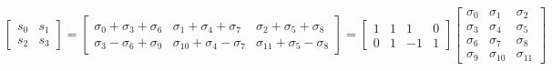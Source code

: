 \documentclass{article}%
\begin{document}
\[%
\left[\begin{matrix}s_{0} & s_{1}\\s_{2} & s_{3}\end{matrix}\right] = \left[\begin{matrix}\sigma_{0} + \sigma_{3} + \sigma_{6} & \sigma_{1} + \sigma_{4} + \sigma_{7} & \sigma_{2} + \sigma_{5} + \sigma_{8}\\\sigma_{3} - \sigma_{6} + \sigma_{9} & \sigma_{10} + \sigma_{4} - \sigma_{7} & \sigma_{11} + \sigma_{5} - \sigma_{8}\end{matrix}\right] = \left[\begin{matrix}1 & 1 & 1 & 0\\0 & 1 & -1 & 1\end{matrix}\right] \left[\begin{matrix}\sigma_{0} & \sigma_{1} & \sigma_{2}\\\sigma_{3} & \sigma_{4} & \sigma_{5}\\\sigma_{6} & \sigma_{7} & \sigma_{8}\\\sigma_{9} & \sigma_{10} & \sigma_{11}\end{matrix}\right]%
\]%
\end{document}
